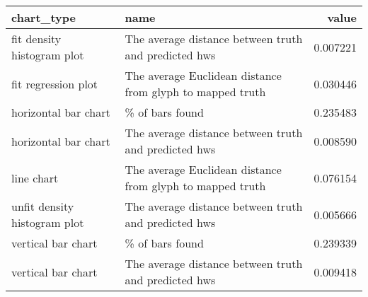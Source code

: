 \begin{tabular}{llr}
\toprule
                  chart\_type &                                                      name &    value \\
\midrule
  fit density histogram plot &      The average distance between truth and predicted hws & 0.007221 \\
         fit regression plot & The average Euclidean distance from glyph to mapped truth & 0.030446 \\
        horizontal bar chart &                                           \% of bars found & 0.235483 \\
        horizontal bar chart &      The average distance between truth and predicted hws & 0.008590 \\
                  line chart & The average Euclidean distance from glyph to mapped truth & 0.076154 \\
unfit density histogram plot &      The average distance between truth and predicted hws & 0.005666 \\
          vertical bar chart &                                           \% of bars found & 0.239339 \\
          vertical bar chart &      The average distance between truth and predicted hws & 0.009418 \\
\bottomrule
\end{tabular}
